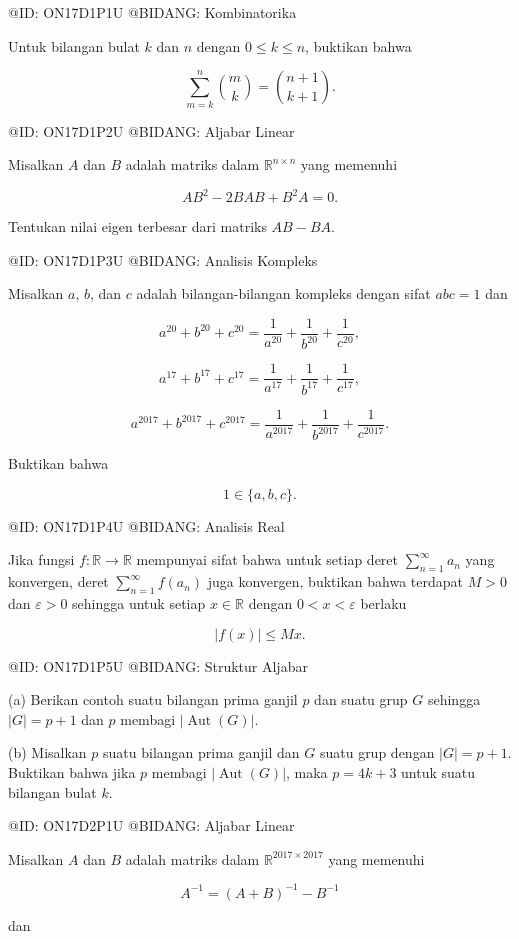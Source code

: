 @ID: ON17D1P1U
@BIDANG: Kombinatorika

Untuk bilangan bulat $k$ dan $n$ dengan $0\le k\le n$, buktikan bahwa

$$
\sum_{m=k}^{n}\binom{m}{k}
=
\binom{n+1}{k+1}.
$$

@ID: ON17D1P2U
@BIDANG: Aljabar Linear

Misalkan $A$ dan $B$ adalah matriks dalam $\mathbb R^{n\times n}$ yang memenuhi

$$
AB^2-2BAB+B^2A=0.
$$

Tentukan nilai eigen terbesar dari matriks $AB-BA$.

@ID: ON17D1P3U
@BIDANG: Analisis Kompleks

Misalkan $a$, $b$, dan $c$ adalah bilangan-bilangan kompleks dengan sifat $abc=1$ dan

$$
a^{20}+b^{20}+c^{20}
=
\frac1{a^{20}}+\frac1{b^{20}}+\frac1{c^{20}},
$$

$$
a^{17}+b^{17}+c^{17}
=
\frac1{a^{17}}+\frac1{b^{17}}+\frac1{c^{17}},
$$

$$
a^{2017}+b^{2017}+c^{2017}
=
\frac1{a^{2017}}+\frac1{b^{2017}}+\frac1{c^{2017}}.
$$

Buktikan bahwa

$$
1\in\{a,b,c\}.
$$

@ID: ON17D1P4U
@BIDANG: Analisis Real

Jika fungsi $f:\mathbb R\to\mathbb R$ mempunyai sifat bahwa untuk setiap deret $\sum_{n=1}^{\infty}a_n$ yang konvergen, deret $\sum_{n=1}^{\infty}f(a_n)$ juga konvergen, buktikan bahwa terdapat $M>0$ dan $\varepsilon>0$ sehingga untuk setiap $x\in\mathbb R$ dengan $0<x<\varepsilon$ berlaku

$$
|f(x)|\le Mx.
$$

@ID: ON17D1P5U
@BIDANG: Struktur Aljabar

(a) Berikan contoh suatu bilangan prima ganjil $p$ dan suatu grup $G$ sehingga $|G|=p+1$ dan $p$ membagi $|\operatorname{Aut}(G)|$.

(b) Misalkan $p$ suatu bilangan prima ganjil dan $G$ suatu grup dengan $|G|=p+1$. Buktikan bahwa jika $p$ membagi $|\operatorname{Aut}(G)|$, maka $p=4k+3$ untuk suatu bilangan bulat $k$.

@ID: ON17D2P1U
@BIDANG: Aljabar Linear

Misalkan $A$ dan $B$ adalah matriks dalam $\mathbb R^{2017\times2017}$ yang memenuhi

$$
A^{-1}=(A+B)^{-1}-B^{-1}
$$

dan

